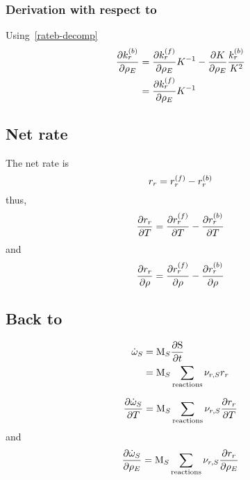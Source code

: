 \subsubsection{Derivation with respect to \mass}
Using~\ref{rateb-decomp}
\begin{equation}
\begin{split}
\doverdm[E]{\bkwdratecons[r]} & = \doverdm[E]{\fwdratecons[r]}\Eqconst^{-1} - \doverdm[E]{\Eqconst}\frac{\bkwdratecons[r]}{\Eqconst^{2}} \\
                              & = \doverdm[E]{\fwdratecons[r]}\Eqconst^{-1}
\end{split}
\label{rateb-decomp-m}
\end{equation}

\subsection{Net rate}

The net rate is
\begin{equation}
\rate[r] = \fwdrate[r] - \bkwdrate[r]
\end{equation}
thus,
\begin{equation}
\doverdT{\rate[r]} = \doverdT{\fwdrate[r]} - \doverdT{\bkwdrate[r]}
\end{equation}
and
\begin{equation}
\doverdm{\rate[r]} = \doverdm{\fwdrate[r]} - \doverdm{\bkwdrate[r]}
\end{equation}

\subsection{Back to \texorpdfstring{\mdot}{omega dot}}
\begin{equation}
\begin{split}
\mdot[S] &= \Mm[S] \doverdt{\ce{S}} \\
         &= \Mm[S] \sum_{\text{reactions}}\scoef[r,S]\rate[r]
\end{split}
\end{equation}

\begin{equation}
\doverdT{\mdot[S]} = \Mm[S] \sum_{\text{reactions}}\scoef[r,S]\doverdT{\rate[r]}
\end{equation}
and
\begin{equation}
\doverdm[E]{\mdot[S]} = \Mm[S] \sum_{\text{reactions}}\scoef[r,S]\doverdm[E]{\rate[r]}
\end{equation}

